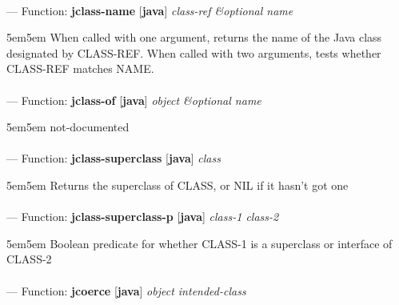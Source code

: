 \paragraph{}
\label{JAVA:JCLASS-NAME}
--- Function: \textbf{jclass-name} [\textbf{java}] \textit{class-ref \&optional name}

\begin{adjustwidth}{5em}{5em}
When called with one argument, returns the name of the Java class
  designated by CLASS-REF. When called with two arguments, tests
  whether CLASS-REF matches NAME.
\end{adjustwidth}

\paragraph{}
\label{JAVA:JCLASS-OF}
--- Function: \textbf{jclass-of} [\textbf{java}] \textit{object \&optional name}

\begin{adjustwidth}{5em}{5em}
not-documented
\end{adjustwidth}

\paragraph{}
\label{JAVA:JCLASS-SUPERCLASS}
--- Function: \textbf{jclass-superclass} [\textbf{java}] \textit{class}

\begin{adjustwidth}{5em}{5em}
Returns the superclass of CLASS, or NIL if it hasn't got one
\end{adjustwidth}

\paragraph{}
\label{JAVA:JCLASS-SUPERCLASS-P}
--- Function: \textbf{jclass-superclass-p} [\textbf{java}] \textit{class-1 class-2}

\begin{adjustwidth}{5em}{5em}
Boolean predicate for whether CLASS-1 is a superclass or interface of CLASS-2
\end{adjustwidth}

\paragraph{}
\label{JAVA:JCOERCE}
--- Function: \textbf{jcoerce} [\textbf{java}] \textit{object intended-class}

